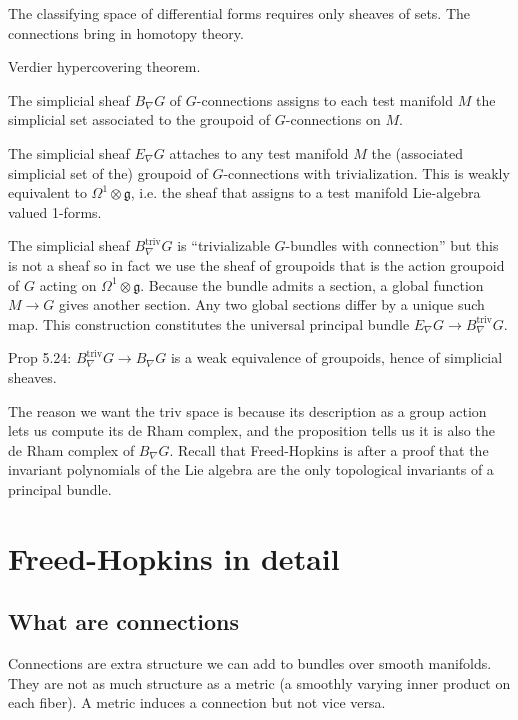 \documentclass[12pt]{article}
\begin{document}
The classifying space of differential forms requires only sheaves of sets. The connections bring in homotopy theory.

Verdier hypercovering theorem.

The simplicial sheaf $B_{\nabla}G$ of $G$-connections assigns to each test manifold $M$ the simplicial set associated to the groupoid of $G$-connections on $M$.

The simplicial sheaf $E_{\nabla}G$ attaches to any test manifold $M$ the (associated simplicial set of the) groupoid of $G$-connections with trivialization. This is weakly equivalent to $\Omega^1 \otimes\mathfrak{g}$, i.e. the sheaf that assigns to a test manifold Lie-algebra valued 1-forms.

The simplicial sheaf $B_{\nabla}^{\mathrm{triv}}G$ is ``trivializable $G$-bundles with connection'' but this is not a sheaf so in fact we use the sheaf of groupoids that is the action groupoid of $G$ acting on $\Omega^1 \otimes\mathfrak{g}$. Because the bundle admits a section, a global function $M\to G$ gives another section. Any two global sections differ by a unique such map. This construction constitutes the universal principal bundle $E_{\nabla}G \to B_{\nabla}^{\mathrm{triv}}G$.

Prop 5.24:  $B_{\nabla}^{\mathrm{triv}}G\to B_{\nabla}G$ is a weak equivalence of groupoids, hence of simplicial sheaves.

The reason we want the triv space is because its description as a group action lets us compute its de Rham complex, and the proposition tells us it is also the de Rham complex of $B_{\nabla}G$. Recall that Freed-Hopkins is after a proof that the invariant polynomials of the Lie algebra are the only topological invariants of a principal bundle.

\section{Freed-Hopkins in detail}
\subsection{What are connections}
Connections are extra structure we can add to bundles over smooth manifolds. They are not as much structure as a metric (a smoothly varying inner product on each fiber). A metric induces a connection but not vice versa.
\end{document}
